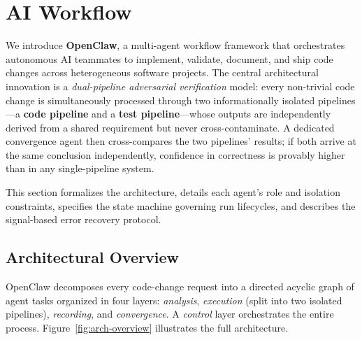 \section{AI Workflow}
\label{sec:ai-workflow}

We introduce \textbf{OpenClaw}, a multi-agent workflow framework that
orchestrates autonomous AI teammates to implement, validate, document,
and ship code changes across heterogeneous software projects. The
central architectural innovation is a \emph{dual-pipeline adversarial
verification} model: every non-trivial code change is simultaneously
processed through two informationally isolated pipelines---a
\textbf{code pipeline} and a \textbf{test pipeline}---whose outputs
are independently derived from a shared requirement but never
cross-contaminate. A dedicated convergence agent then cross-compares
the two pipelines' results; if both arrive at the same conclusion
independently, confidence in correctness is provably higher than in
any single-pipeline system.

This section formalizes the architecture, details each agent's role
and isolation constraints, specifies the state machine governing run
lifecycles, and describes the signal-based error recovery protocol.


\subsection{Architectural Overview}
\label{sec:arch-overview}

OpenClaw decomposes every code-change request into a directed acyclic
graph of agent tasks organized in four layers: \emph{analysis},
\emph{execution} (split into two isolated pipelines), \emph{recording},
and \emph{convergence}. A \emph{control} layer orchestrates the entire
process. Figure~\ref{fig:arch-overview} illustrates the full
architecture.

